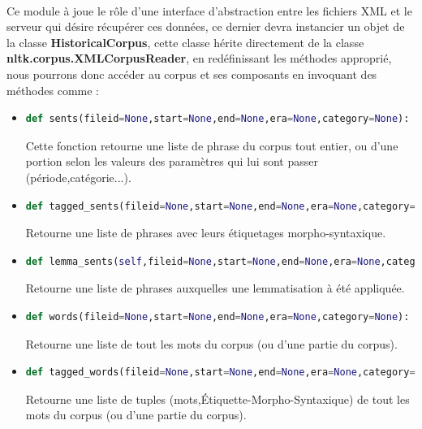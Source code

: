 \documentclass[]{report}
\begin{document}
			\paragraph{}
			Ce module à joue le rôle d'une interface d'abstraction entre les fichiers XML et le serveur qui désire récupérer ces données,
			ce dernier devra instancier un objet de la classe \textbf{HistoricalCorpus}, cette classe hérite directement de la classe \textbf{nltk.corpus.XMLCorpusReader}, en redéfinissant les méthodes approprié, nous pourrons donc accéder au corpus et ses composants en 
			invoquant des méthodes comme : 
			\begin{itemize}
				
				\item 
				\begin{lstlisting}[language=python]
					def sents(fileid=None,start=None,end=None,era=None,category=None):\end{lstlisting} 
				Cette fonction retourne une liste de phrase du corpus tout entier, ou d'une portion selon les valeurs des paramètres qui lui sont passer (période,catégorie...).
				
				\item 
				\begin{lstlisting}[language=python]
					def tagged_sents(fileid=None,start=None,end=None,era=None,category=None):\end{lstlisting}
				Retourne une liste de phrases avec leurs étiquetages morpho-syntaxique.
				
				\item 
				\begin{lstlisting}[language=python]
				def lemma_sents(self,fileid=None,start=None,end=None,era=None,category=None):\end{lstlisting}
				Retourne une liste de phrases auxquelles une lemmatisation à été appliquée.
				
				
				\item 
				\begin{lstlisting}[language=python]
					def words(fileid=None,start=None,end=None,era=None,category=None):\end{lstlisting}
				Retourne une liste de tout les mots du corpus (ou d'une partie du corpus).
				
				\item 
				\begin{lstlisting}[language=python]
				def tagged_words(fileid=None,start=None,end=None,era=None,category=None):\end{lstlisting}
				Retourne une liste de tuples (mots,Étiquette-Morpho-Syntaxique) de tout les mots du corpus (ou d'une partie du corpus).
				

\end{itemize}
\end{document}
